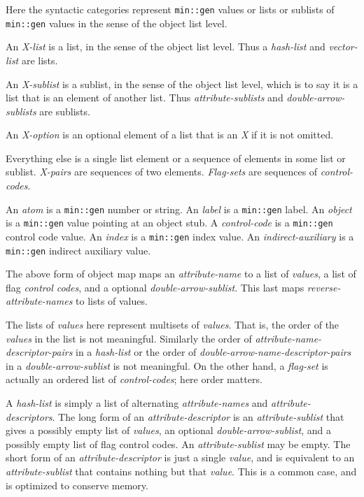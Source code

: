 \documentclass[12pt]{article}
\begin{document}
Here the syntactic categories represent \verb|min::gen| values
or lists or sublists
of \verb|min::gen| values in the sense of the object list level.

An {\em X-list} is a list, in the sense of the object list level.  Thus
a {\em hash-list} and {\em vector-list} are lists.

An {\em X-sublist} is a sublist, in the sense of the object list level, which
is to say it is a list that is an element of another list.  Thus
{\em attribute-sublists} and {\em double-arrow-sublists} are sublists.

An {\em X-option} is an optional element of a list that is an {\em X} if
it is not omitted.

Everything else is a single list element or
a sequence of elements in some list or sublist.
{\em X-pairs} are sequences of two elements.
{\em Flag-sets} are sequences of {\em control-codes}.

An {\em atom} is a \verb|min::gen| number or string.
An {\em label} is a \verb|min::gen| label.
An {\em object} is a \verb|min::gen| value pointing at an object stub.
A {\em control-code} is a \verb|min::gen| control code value.
An {\em index} is a \verb|min::gen| index value.
An {\em indirect-auxiliary} is a \verb|min::gen| indirect auxiliary value.

The above form of object map maps an {\em attribute-name} to a list of
{\em values}, a list of flag {\em control codes}, and a optional
{\em double-arrow-sublist}.  This last maps {\em reverse-attribute-names}
to lists of values.

The lists of {\em values} here represent multisets of {\em values}.
That is, the
order of the {\em values} in the list is not meaningful.
Similarly the order of {\em attribute-name-descriptor-pairs}
in a {\em hash-list}
or the order of {\em double-arrow-name-descriptor-pairs}
in a {\em double-arrow-sublist} is not meaningful.
On the other hand, a {\em flag-set} is actually an ordered list
of {\em control-codes}; here order matters.

A {\em hash-list} is simply a list of alternating {\em attribute-names}
and {\em attribute-descriptors}.
The long form of an {\em attribute-descriptor} is an
{\em attribute-sublist} that gives  a possibly empty list of {\em values},
an optional {\em double-arrow-sublist}, and a possibly empty
list of flag control codes.
An {\em attribute-sublist} may be empty.
The short form of an {\em attribute-descriptor} is just a single
{\em value}, and is equivalent to an {\em attribute-sublist}
that contains nothing but that {\em value}.
This is a common case, and is optimized to conserve memory.
\end{document}
